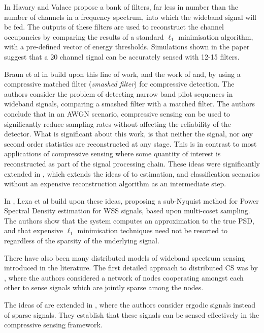 In \cite{havary2010compressive} Havary and Valaee propose a bank of filters, far less in  number than the number of channels in a frequency spectrum, into which the wideband signal will be fed. The outputs of these filters are used to reconstruct the channel occupancies by comparing the results of a standard \(\ell_1\) minimisation algorithm, with a pre-defined vector of energy thresholds. Simulations shown in the paper suggest that a 20 channel signal can be accurately sensed with 12-15 filters.

Braun et al in \cite{braun2009signal} build upon this line of work, and the work of \cite{Davenport2007} and, by using a compressive matched filter (\textit{smashed filter}) for compressive detection. The authors consider the problem of detecting narrow band pilot sequences in wideband signals, comparing a smashed filter with a matched filter. The authors conclude that in an AWGN scenario, compressive sensing can be used to significantly reduce sampling rates without affecting the reliability of the detector. What is significant about this work, is that neither the signal, nor any second order statistics are reconstructed at any stage. This is in contrast to most applications of compressive sensing where some quantity of interest is reconstructed as part of the signal processing chain. These ideas were significantly extended in \cite{davenport2010signal}, which extends the ideas of \cite{Davenport2007} to estimation, and classification scenarios without an expensive reconstruction algorithm as an intermediate step.

In \cite{lexa2011compressive}, Lexa et al build upon these ideas, proposing a sub-Nyquist method for Power Spectral Density estimation for WSS signals, based upon multi-coset sampling. The authors show that the system computes an approximation to the true PSD, and that expensive \(\ell_1\) minimisation techniques need not be resorted to regardless of the sparsity of the underlying signal. 

There have also been many distributed models of wideband spectrum sensing introduced in the literature. The first detailed approach to distributed CS was by \cite{Duarte}, where the authors considered a network of nodes cooperating amongst each other to sense signals which are jointly sparse among the nodes.

The ideas of \cite{Duarte} are extended in \cite{Ma2014b}, where the authors consider ergodic signals instead of sparse signals. They establish that these signals can be sensed effectively in the compressive sensing framework.

